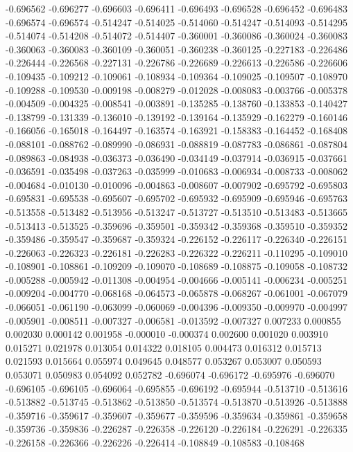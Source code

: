 -0.696562
-0.696277
-0.696603
-0.696411
-0.696493
-0.696528
-0.696452
-0.696483
-0.696574
-0.696574
-0.514247
-0.514025
-0.514060
-0.514247
-0.514093
-0.514295
-0.514074
-0.514208
-0.514072
-0.514407
-0.360001
-0.360086
-0.360024
-0.360083
-0.360063
-0.360083
-0.360109
-0.360051
-0.360238
-0.360125
-0.227183
-0.226486
-0.226444
-0.226568
-0.227131
-0.226786
-0.226689
-0.226613
-0.226586
-0.226606
-0.109435
-0.109212
-0.109061
-0.108934
-0.109364
-0.109025
-0.109507
-0.108970
-0.109288
-0.109530
-0.009198
-0.008279
-0.012028
-0.008083
-0.003766
-0.005378
-0.004509
-0.004325
-0.008541
-0.003891
-0.135285
-0.138760
-0.133853
-0.140427
-0.138799
-0.131339
-0.136010
-0.139192
-0.139164
-0.135929
-0.162279
-0.160146
-0.166056
-0.165018
-0.164497
-0.163574
-0.163921
-0.158383
-0.164452
-0.168408
-0.088101
-0.088762
-0.089990
-0.086931
-0.088819
-0.087783
-0.086861
-0.087804
-0.089863
-0.084938
-0.036373
-0.036490
-0.034149
-0.037914
-0.036915
-0.037661
-0.036591
-0.035498
-0.037263
-0.035999
-0.010683
-0.006934
-0.008733
-0.008062
-0.004684
-0.010130
-0.010096
-0.004863
-0.008607
-0.007902
-0.695792
-0.695803
-0.695831
-0.695538
-0.695607
-0.695702
-0.695932
-0.695909
-0.695946
-0.695763
-0.513558
-0.513482
-0.513956
-0.513247
-0.513727
-0.513510
-0.513483
-0.513665
-0.513413
-0.513525
-0.359696
-0.359501
-0.359342
-0.359368
-0.359510
-0.359352
-0.359486
-0.359547
-0.359687
-0.359324
-0.226152
-0.226117
-0.226340
-0.226151
-0.226063
-0.226323
-0.226181
-0.226283
-0.226322
-0.226211
-0.110295
-0.109010
-0.108901
-0.108861
-0.109209
-0.109070
-0.108689
-0.108875
-0.109058
-0.108732
-0.005288
-0.005942
-0.011308
-0.004954
-0.004666
-0.005141
-0.006234
-0.005251
-0.009204
-0.004770
-0.068168
-0.064573
-0.065878
-0.068267
-0.061001
-0.067079
-0.066051
-0.061190
-0.063099
-0.060069
-0.004396
-0.009350
-0.009970
-0.004997
-0.005901
-0.008511
-0.007327
-0.006581
-0.013592
-0.007327
0.007233
0.000855
0.002030
0.000142
0.001958
-0.000010
-0.000374
0.002600
0.001020
0.003910
0.015271
0.021978
0.013054
0.014322
0.018105
0.004473
0.016312
0.015713
0.021593
0.015664
0.055974
0.049645
0.048577
0.053267
0.053007
0.050593
0.053071
0.050983
0.054092
0.052782
-0.696074
-0.696172
-0.695976
-0.696070
-0.696105
-0.696105
-0.696064
-0.695855
-0.696192
-0.695944
-0.513710
-0.513616
-0.513882
-0.513745
-0.513862
-0.513850
-0.513574
-0.513870
-0.513926
-0.513888
-0.359716
-0.359617
-0.359607
-0.359677
-0.359596
-0.359634
-0.359861
-0.359658
-0.359736
-0.359836
-0.226287
-0.226358
-0.226120
-0.226184
-0.226291
-0.226335
-0.226158
-0.226366
-0.226226
-0.226414
-0.108849
-0.108583
-0.108468
